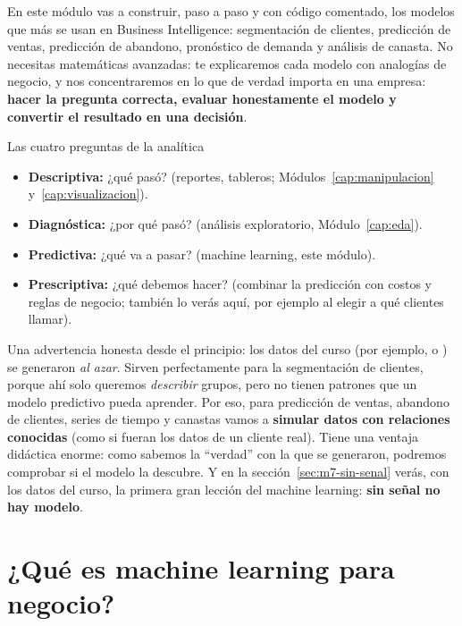 En este módulo vas a construir, paso a paso y con código comentado, los modelos
que más se usan en Business Intelligence: segmentación de clientes, predicción
de ventas, predicción de abandono, pronóstico de demanda y análisis de canasta.
No necesitas matemáticas avanzadas: te explicaremos cada modelo con analogías
de negocio, y nos concentraremos en lo que de verdad importa en una empresa:
\textbf{hacer la pregunta correcta, evaluar honestamente el modelo y convertir
el resultado en una decisión}.

\begin{concepto}{Las cuatro preguntas de la analítica}
\begin{itemize}
  \item \textbf{Descriptiva:} ¿qué pasó? (reportes, tableros; Módulos~\ref{cap:manipulacion}
        y~\ref{cap:visualizacion}).
  \item \textbf{Diagnóstica:} ¿por qué pasó? (análisis exploratorio, Módulo~\ref{cap:eda}).
  \item \textbf{Predictiva:} ¿qué va a pasar? (machine learning, este módulo).
  \item \textbf{Prescriptiva:} ¿qué debemos hacer? (combinar la predicción con
        costos y reglas de negocio; también lo verás aquí, por ejemplo al
        elegir a qué clientes llamar).
\end{itemize}
\end{concepto}

Una advertencia honesta desde el principio: los datos del curso (por
ejemplo,  o ) se generaron
\emph{al azar}. Sirven perfectamente para la segmentación de clientes, porque
ahí solo queremos \emph{describir} grupos, pero no tienen patrones que un modelo
predictivo pueda aprender. Por eso, para predicción de ventas, abandono de
clientes, series de tiempo y canastas vamos a \textbf{simular datos con
relaciones conocidas} (como si fueran los datos de un cliente real). Tiene una
ventaja didáctica enorme: como sabemos la ``verdad'' con la que se generaron,
podremos comprobar si el modelo la descubre. Y en la
sección~\ref{sec:m7-sin-senal} verás, con los datos del curso, la primera gran
lección del machine learning: \textbf{sin señal no hay modelo}.

\section{¿Qué es machine learning para negocio?}
\label{sec:m7-que-es}

